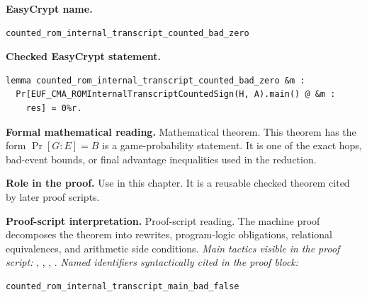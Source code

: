 \begin{formaltheorem}
\noindent\textbf{EasyCrypt name.}
\begin{lstlisting}[language=EasyCrypt,basicstyle=\ttfamily\scriptsize]
counted_rom_internal_transcript_counted_bad_zero
\end{lstlisting}
\noindent\textbf{Checked EasyCrypt statement.}
\begin{lstlisting}[language=EasyCrypt,basicstyle=\ttfamily\scriptsize]
lemma counted_rom_internal_transcript_counted_bad_zero &m :
  Pr[EUF_CMA_ROMInternalTranscriptCountedSign(H, A).main() @ &m :
    res] = 0%r.
\end{lstlisting}
\noindent\textbf{Formal mathematical reading.}
Mathematical theorem. This theorem has the form \(\Pr[G:E] = B\) is a game-probability statement.  It is one of the exact hops, bad-event bounds, or final advantage inequalities used in the reduction.

\noindent\textbf{Role in the proof.}
Use in this chapter. It is a reusable checked theorem cited by later proof scripts.

\noindent\textbf{Proof-script interpretation.}
Proof-script reading. The machine proof decomposes the theorem into rewrites, program-logic obligations, relational equivalences, and arithmetic side conditions.
\emph{Main tactics visible in the proof script:} , , , .
\emph{Named identifiers syntactically cited in the proof block:}
\begin{lstlisting}[language=EasyCrypt,basicstyle=\ttfamily\scriptsize]
counted_rom_internal_transcript_main_bad_false
\end{lstlisting}

\end{formaltheorem}

